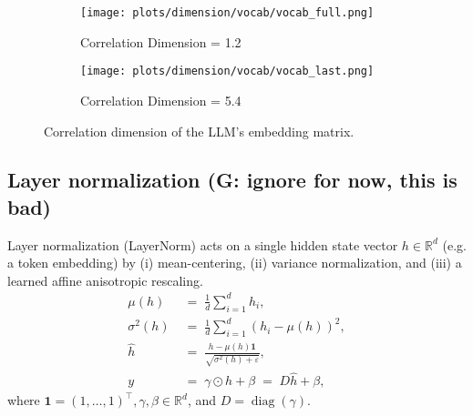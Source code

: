 \documentclass[a4paper,12pt]{article}
\begin{document}
\begin{figure}[H]
    \centering
    \begin{subfigure}[b]{0.48\linewidth}
        \centering
        \texttt{[image: plots/dimension/vocab/vocab\_full.png]}
        \caption{Correlation Dimension = 1.2}
    \end{subfigure}\hfill
    \begin{subfigure}[b]{0.48\linewidth}
        \centering
        \texttt{[image: plots/dimension/vocab/vocab\_last.png]}
        \caption{Correlation Dimension = 5.4}
    \end{subfigure}
    \caption{Correlation dimension of the LLM's embedding matrix.}
    \label{fig:embedding_dim}
\end{figure}


\subsection{Layer normalization (G: ignore for now, this is bad)}\label{subsec:layer_norm}%

Layer normalization (LayerNorm) acts on a single hidden state vector \(h\in\mathbb{R}^d\) (e.g. a token embedding) by (i) mean-centering, (ii) variance normalization, and (iii) a learned affine anisotropic rescaling.
\begin{align}
\mu(h) &\;=\; \frac{1}{d}\sum_{i=1}^d h_i, \\
\sigma^2(h) &\;=\; \frac{1}{d}\sum_{i=1}^d (h_i-\mu(h))^2, \\
\widehat{h} &\;=\; \frac{h - \mu(h)\mathbf{1}}{\sqrt{\sigma^2(h)+\varepsilon}}, \label{eq:ln_norm}\\
y &\;=\; \gamma \odot \widehat{h} + \beta \;=\; D\widehat{h} + \beta, \label{eq:ln_affine}
\end{align}
where \(\mathbf{1}=(1,\dots,1)^\top , \gamma, \beta \in\mathbb{R}^d\), and \(D=\operatorname{diag}(\gamma)\).
\end{document}
